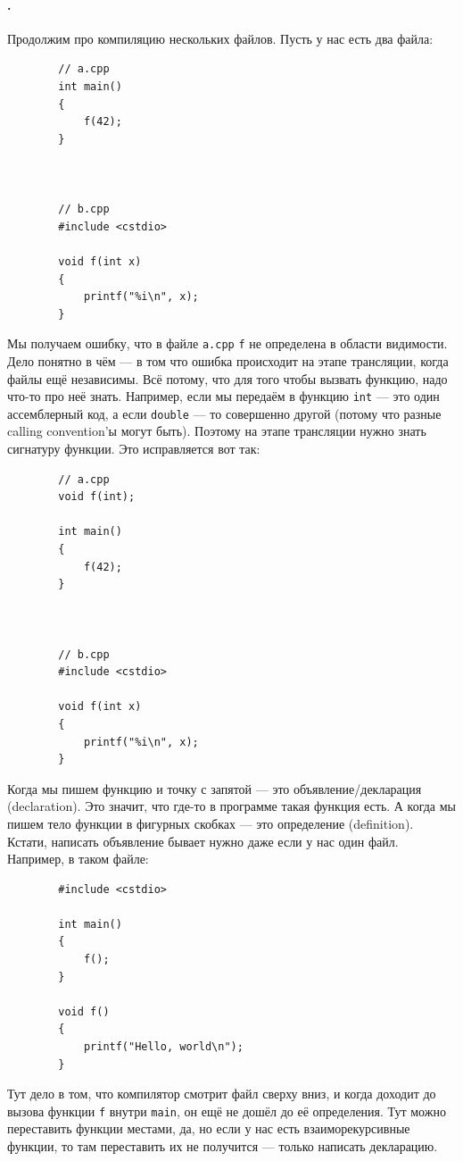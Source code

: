 \documentclass{article}
\begin{document}
    \paragraph{.}
    Продолжим про компиляцию нескольких файлов. Пусть у нас есть два файла:
    \begin{verbatim}
        // a.cpp
        int main()
        {
            f(42);
        }



        // b.cpp
        #include <cstdio>
        
        void f(int x)
        {
            printf("%i\n", x);
        }
    \end{verbatim}
    Мы получаем ошибку, что в файле \texttt{a.cpp} \texttt{f} не определена в области видимости. Дело понятно в чём --- в том что ошибка происходит на этапе трансляции, когда файлы ещё независимы. Всё потому, что для того чтобы вызвать функцию, надо что-то про неё знать. Например, если мы передаём в функцию \texttt{int} --- это один ассемблерный код, а если \texttt{double} --- то совершенно другой (потому что разные calling convention'ы могут быть). Поэтому на этапе трансляции нужно знать сигнатуру функции. Это исправляется вот так:
    \begin{verbatim}
        // a.cpp
        void f(int);

        int main()
        {
            f(42);
        }



        // b.cpp
        #include <cstdio>
    
        void f(int x)
        {
            printf("%i\n", x);
        }
    \end{verbatim}
    Когда мы пишем функцию и точку с запятой --- это объявление/декларация (declaration). Это значит, что где-то в программе такая функция есть. А когда мы пишем тело функции в фигурных скобках --- это определение (definition).\\
    Кстати, написать объявление бывает нужно даже если у нас один файл. Например, в таком файле:
    \begin{verbatim}
        #include <cstdio>

        int main()
        {
            f();
        }

        void f()
        {
            printf("Hello, world\n");
        }
    \end{verbatim}
    Тут дело в том, что компилятор смотрит файл сверху вниз, и когда доходит до вызова функции \texttt{f} внутри \texttt{main}, он ещё не дошёл до её определения. Тут можно переставить функции местами, да, но если у нас есть взаиморекурсивные функции, то там переставить их не получится --- только написать декларацию.
\end{document}
